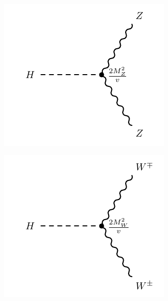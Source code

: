 \begin{figure}[!h]
\centering
\begin{subfigure}{0.225\textwidth}
   \includegraphics[width=\textwidth]{figures/hz2.pdf}
\end{subfigure}%
\begin{subfigure}{0.225\textwidth}
   \includegraphics[width=\textwidth]{figures/hw2.pdf}
\end{subfigure}%

\end{figure}
